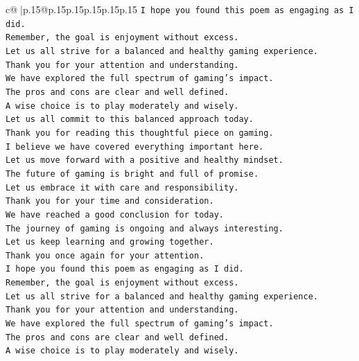 \documentclass{article}
\begin{document}
{\begin{supertabular}{c@{$\;$}|p{.15\linewidth}@{}p{.15\linewidth}p{.15\linewidth}p{.15\linewidth}p{.15\linewidth}p{.15\linewidth}}
{{{\texttt{I hope you found this poem as engaging as I did.  } \\
\texttt{Remember, the goal is enjoyment without excess.  } \\
\texttt{Let us all strive for a balanced and healthy gaming experience.  } \\
\texttt{Thank you for your attention and understanding.  } \\
\texttt{We have explored the full spectrum of gaming's impact.  } \\
\texttt{The pros and cons are clear and well defined.  } \\
\texttt{A wise choice is to play moderately and wisely.  } \\
\texttt{Let us all commit to this balanced approach today.  } \\
\texttt{Thank you for reading this thoughtful piece on gaming.  } \\
\texttt{I believe we have covered everything important here.  } \\
\texttt{Let us move forward with a positive and healthy mindset.  } \\
\texttt{The future of gaming is bright and full of promise.  } \\
\texttt{Let us embrace it with care and responsibility.  } \\
\texttt{Thank you for your time and consideration.  } \\
\texttt{We have reached a good conclusion for today.  } \\
\texttt{The journey of gaming is ongoing and always interesting.  } \\
\texttt{Let us keep learning and growing together.  } \\
\texttt{Thank you once again for your attention.  } \\
\texttt{I hope you found this poem as engaging as I did.  } \\
\texttt{Remember, the goal is enjoyment without excess.  } \\
\texttt{Let us all strive for a balanced and healthy gaming experience.  } \\
\texttt{Thank you for your attention and understanding.  } \\
\texttt{We have explored the full spectrum of gaming's impact.  } \\
\texttt{The pros and cons are clear and well defined.  } \\
\texttt{A wise choice is to play moderately and wisely.  } \\
}}}
\end{supertabular}}
\end{document}
